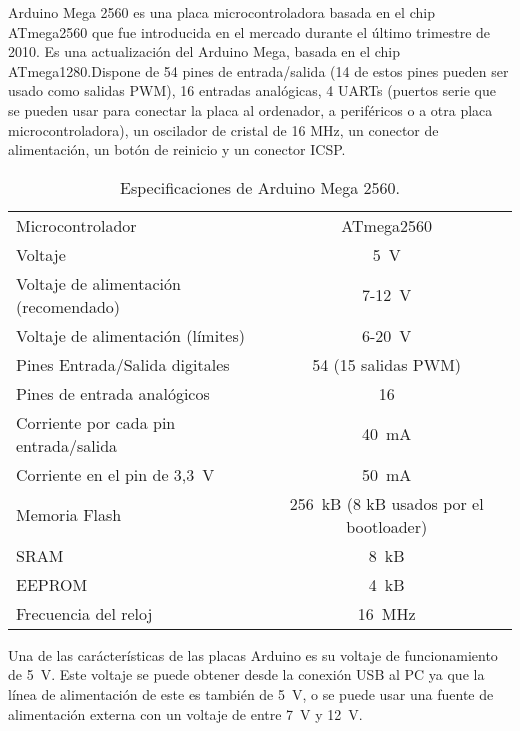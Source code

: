 
Arduino Mega 2560 es una placa microcontroladora basada en el chip ATmega2560 que fue introducida en el mercado durante el último trimestre de 2010.  
Es una actualización del Arduino Mega, basada en el chip ATmega1280.\@ Dispone de 54 pines de entrada/salida (14 de estos pines pueden ser usado como salidas PWM), 16 entradas analógicas, 4 UARTs (puertos serie que se pueden usar para conectar la placa al ordenador, a periféricos o a otra placa microcontroladora), un oscilador de cristal de 16 MHz, un conector de alimentación, un botón de reinicio y un conector ICSP.\@

\begin{table}
\begin{center}
\begin{tabular}{| l | c |}
\hline
Microcontrolador 						& ATmega2560 \\
Voltaje									& 5~V \\
Voltaje de alimentación (recomendado) 	& 7-12~V \\
Voltaje de alimentación (límites) 		& 6-20~V \\
Pines Entrada/Salida digitales			& 54 (15 salidas PWM) \\
Pines de entrada analógicos				& 16 \\
Corriente por cada pin entrada/salida 	& 40~mA \\
Corriente en el pin de 3,3~V				& 50~mA \\
Memoria Flash 							& 256~kB (8 kB usados por el bootloader) \\
SRAM									& 8~kB \\
EEPROM									& 4~kB \\
Frecuencia del reloj					& 16~MHz \\
\hline
\end{tabular}
\end{center}
\caption{Especificaciones de Arduino Mega 2560.}
\label{tab:mega2560_specs}
\end{table}
Una de las carácterísticas de las placas Arduino es su voltaje de funcionamiento de 5~V. Este voltaje se puede obtener desde la conexión USB al PC ya que la línea de alimentación de este es también de 5~V, o se puede usar una fuente de alimentación externa con un voltaje de entre 7~V y 12~V.

